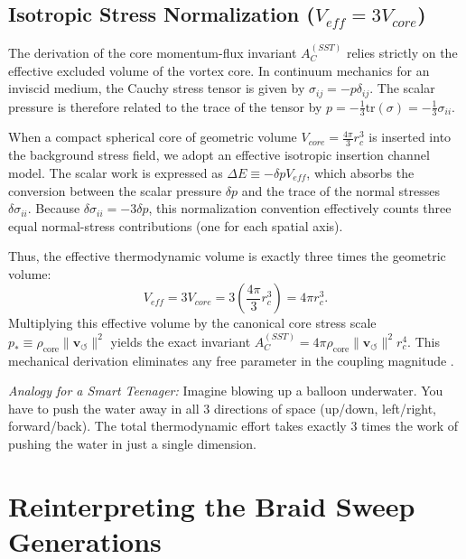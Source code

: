 \documentclass[11pt, a4paper]{article}
\newcommand{\vswirl}{\mathbf{v}_{\!\boldsymbol{\circlearrowleft}}}
\newcommand{\rhocore}{\rho_{\text{core}}}
\newcommand{\rc}{r_c}
\begin{document}
            \subsection{Isotropic Stress Normalization ($V_{eff} = 3 V_{core}$)}
                The derivation of the core momentum-flux invariant $A_C^{(SST)}$ relies strictly on the effective excluded volume of the vortex core. In continuum mechanics for an inviscid medium, the Cauchy stress tensor is given by $\sigma_{ij} = -p \delta_{ij}$. The scalar pressure is therefore related to the trace of the tensor by $p = -\frac{1}{3}\text{tr}(\sigma) = -\frac{1}{3}\sigma_{ii}$.
                
                When a compact spherical core of geometric volume $V_{core} = \frac{4\pi}{3}\rc^3$ is inserted into the background stress field, we adopt an effective isotropic insertion channel model. The scalar work is expressed as $\Delta E \equiv -\delta p V_{eff}$, which absorbs the conversion between the scalar pressure $\delta p$ and the trace of the normal stresses $\delta\sigma_{ii}$. Because $\delta\sigma_{ii} = -3\delta p$, this normalization convention effectively counts three equal normal-stress contributions (one for each spatial axis).
                
                Thus, the effective thermodynamic volume is exactly three times the geometric volume:
                \begin{equation}
                    V_{eff} = 3 V_{core} = 3 \left( \frac{4\pi}{3}\rc^3 \right) = 4\pi\rc^3.
                \end{equation}
                Multiplying this effective volume by the canonical core stress scale $p_* \equiv \rhocore \lVert \vswirl \rVert^2$ yields the exact invariant $A_C^{(SST)} = 4\pi \rhocore \lVert \vswirl \rVert^2 \rc^4$. This mechanical derivation eliminates any free parameter in the coupling magnitude \cite{LandauLifshitz1987}.
                
                \emph{Analogy for a Smart Teenager:} Imagine blowing up a balloon underwater. You have to push the water away in all 3 directions of space (up/down, left/right, forward/back). The total thermodynamic effort takes exactly 3 times the work of pushing the water in just a single dimension.

        \section{Reinterpreting the Braid Sweep Generations}
            \label{sec:reinterpreting_generations}
            
\end{document}
